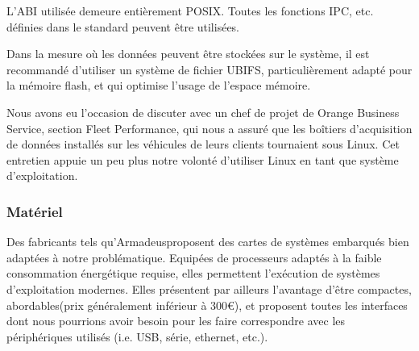 L'ABI utilisée demeure entièrement POSIX\footnotemark. Toutes les fonctions IPC, etc. définies dans le standard peuvent être utilisées\footnotemark.



Dans la mesure où les données peuvent être stockées sur le système, il est recommandé d'utiliser un système de fichier UBIFS\footnotemark, particulièrement adapté pour la mémoire flash, et qui optimise l'usage de l'espace mémoire.


Nous avons eu l’occasion de discuter avec un chef de projet de Orange Business Service, section Fleet Performance, qui nous a assuré que les boîtiers d'acquisition de données installés sur les véhicules de leurs clients tournaient sous Linux. Cet entretien appuie un peu plus notre volonté d'utiliser Linux en tant que système d'exploitation.

\subsubsection{Matériel}

Des fabricants tels qu'Armadeus\footnotemark proposent des cartes de systèmes embarqués bien adaptées à notre problématique. Equipées de processeurs adaptés à la faible consommation énergétique requise, elles permettent l'exécution de systèmes d'exploitation modernes. Elles présentent par ailleurs l'avantage d'être compactes, abordables\footnotemark (prix généralement inférieur à 300\euro ), et proposent toutes les interfaces dont nous pourrions avoir besoin pour les faire correspondre avec les périphériques utilisés (i.e. USB, série, ethernet, etc.).



